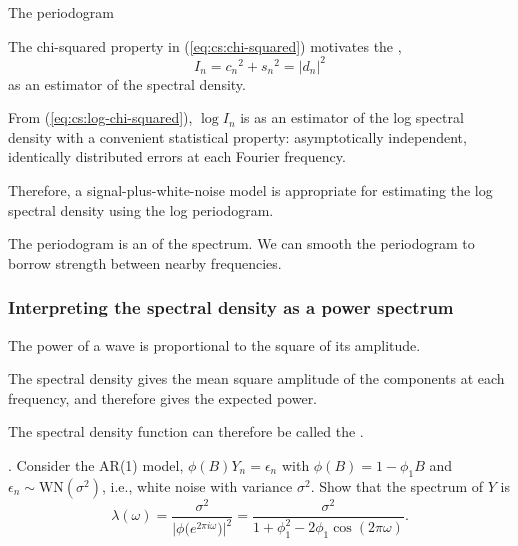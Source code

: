 \begin{frame}{The periodogram}

\bi
\item  The chi-squared property in (\ref{eq:cs:chi-squared}) motivates the ,
\begin{equation} I_n = {{c_n}}^2 + {{s_n}}^2 = \big|  {d_n}\big|^2\end{equation}
as an estimator of the spectral density. 

\item  From (\ref{eq:cs:log-chi-squared}), $\log I_n$ is as an estimator of the log spectral density with a convenient statistical property: asymptotically independent, identically distributed errors at each Fourier frequency.

\item  Therefore, a signal-plus-white-noise model is appropriate for estimating the log spectral density using the log periodogram.

\item The periodogram is an  of the spectrum. We can smooth the periodogram to borrow strength between nearby frequencies.

\ei

\end{frame}


\begin{frame}[fragile]

\frametitle{Interpreting the spectral density as a power spectrum}

\bi

\item  The power of a wave is proportional to the square of its amplitude. 

\item  The spectral density gives the mean square amplitude of the components at each frequency, and therefore gives the expected power.

\item  The spectral density function can therefore be called the .

\ei

\end{frame}

\begin{frame}
\myquestion. Consider the AR(1) model, $\phi(B)Y_n = \epsilon_n$ with $\phi(B)=1-\phi_1B$ and $\epsilon_n \sim \mathrm{WN}(\sigma^2)$, i.e., white noise with variance $\sigma^2$. Show that the spectrum of $Y$ is
\begin{equation}
\lambda(\omega)=\frac{\sigma^2}{\big|\phi\big( e^{2\pi i \omega}\big)\big|^2}
= \frac{\sigma^2}{1+\phi_1^2 - 2\phi_1\cos(2\pi\omega)}.
\end{equation}


\end{frame}

